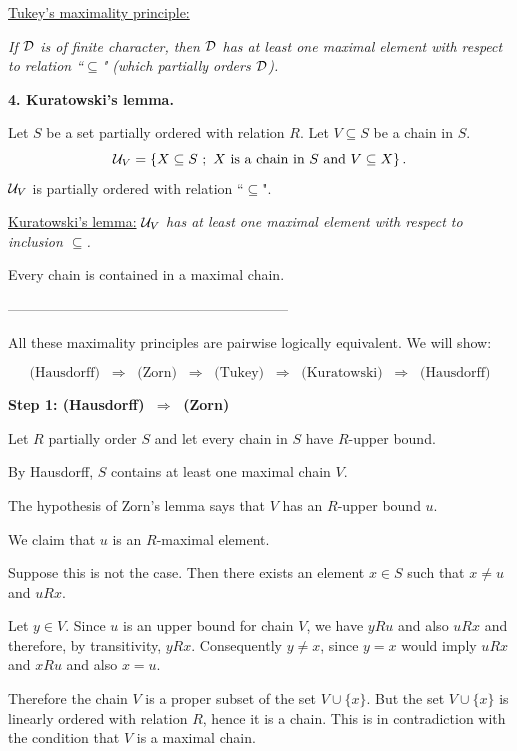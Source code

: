 \documentclass[11pt,paper=b5,footinclude,headinclude]{scrbook} %
\def\sledi {{~\Rightarrow~}}
\theoremstyle{remark}
\theoremstyle{definition} %
\theoremstyle{theorem} %
\begin{document}
%

\bigskip
\underline{Tukey's maximality principle:}

{\em If ${\cal D}$ is of finite character, then ${\cal D}$
has at least one maximal element with respect to relation ``$\subseteq$" (which partially orders ${\cal D}$).}

\bigskip

\textbf{ 4. Kuratowski's lemma.}

Let $S$ be a set partially ordered with relation $R$.
Let $V\subseteq S$ be a chain in $S$.
$${\cal U}_V = \{X\subseteq S~;~X\textrm{ is a chain in }S \textrm{ and } V\subseteq X\}\,.$$
${\cal U}_V$ is partially ordered with relation ``$\subseteq$".

\underline{Kuratowski's lemma:}
{\em ${\cal U}_V$ has at least one maximal element with respect to inclusion $\subseteq$.}

\medskip
Every chain is contained in a maximal chain.

------------------------------------------------------------

\bigskip

All these maximality principles are pairwise logically equivalent.
We will show:

$$\textrm{(Hausdorff) $\sledi$ (Zorn) $\sledi$ (Tukey) $\sledi$ (Kuratowski) $\sledi$ (Hausdorff)}$$


\bigskip
\textbf{ Step 1: (Hausdorff) $\sledi$ (Zorn)}

Let $R$ partially order $S$ and let every chain in $S$ have $R$-upper bound.

By Hausdorff, $S$ contains at least one maximal chain $V$.

The hypothesis of Zorn's lemma says that $V$ has an $R$-upper bound $u$.

We claim that $u$ is an $R$-maximal element.

Suppose this is not the case.
Then there exists an element $x\in S$ such that $x\neq u$ and $uRx$.

Let $y\in V$. Since $u$ is an upper bound for chain $V$, we have $yRu$ and also $uRx$ and
therefore, by transitivity, $yRx$. Consequently $y\neq x$, since $y=x$ would imply $uRx$ and $xRu$ and also $x = u$.

Therefore the chain $V$ is a proper subset of the set $V\cup \{x\}$. But the set $V\cup \{x\}$ is linearly ordered with relation $R$, hence it is a chain.
This is in contradiction with the condition that $V$ is a maximal chain.
\end{document}
